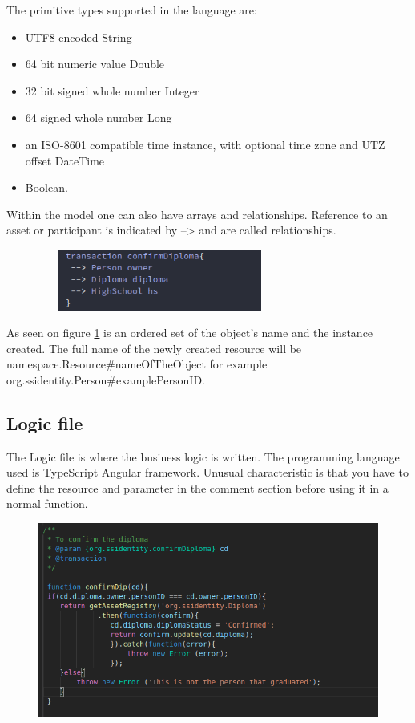\documentclass[a4paper,11pt]{report}
\begin{document}
The primitive types supported in the language are:
\begin{itemize}

\item UTF8 encoded String 
\item 64 bit numeric value Double 
\item 32 bit signed whole number Integer 
\item 64 signed whole number Long
\item an ISO-8601 compatible time instance, with optional time zone and UTZ offset DateTime 
\item Boolean. 

\end{itemize}
Within the model one can also have arrays and relationships. Reference to an asset or participant is indicated by --> and are called relationships.

\begin{figure}[h]
\centering
  \includegraphics[height = 2cm ,width = 8cm]{transaction.png}
  \label{transactionRelationship}
\end{figure}

As seen on figure \ref{transactionRelationship} is an ordered set of the object’s name and the instance created. The full name of the newly created resource will be namespace.Resource\#nameOfTheObject for example org.ssidentity.Person\#examplePersonID.

\subsection{Logic file}

The Logic file is where the business logic is written. The programming language used is TypeScript Angular framework. Unusual characteristic is that you have to define the resource and parameter in the comment section before using it in a normal function. 

\begin{figure}[h]
\centering
  \includegraphics[width = 12cm]{confirmdip.png}
  \label{transactionlogicfile}
\end{figure}
\end{document}
